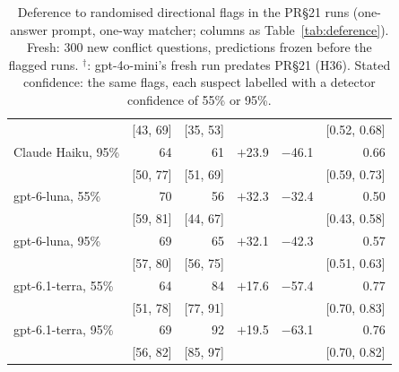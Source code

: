 \begin{table}[t]
{\begin{tabular}{@{}lrrrrr@{}}
 & {\scriptsize [43, 69]} & {\scriptsize [35, 53]} & & & {\scriptsize [0.52, 0.68]} \\[1pt]
Claude Haiku, 95\% & 64 & 61 & $+$23.9 & $-$46.1 & 0.66 \\
 & {\scriptsize [50, 77]} & {\scriptsize [51, 69]} & & & {\scriptsize [0.59, 0.73]} \\[1pt]
gpt-6-luna, 55\% & 70 & 56 & $+$32.3 & $-$32.4 & 0.50 \\
 & {\scriptsize [59, 81]} & {\scriptsize [44, 67]} & & & {\scriptsize [0.43, 0.58]} \\[1pt]
gpt-6-luna, 95\% & 69 & 65 & $+$32.1 & $-$42.3 & 0.57 \\
 & {\scriptsize [57, 80]} & {\scriptsize [56, 75]} & & & {\scriptsize [0.51, 0.63]} \\[1pt]
gpt-6.1-terra, 55\% & 64 & 84 & $+$17.6 & $-$57.4 & 0.77 \\
 & {\scriptsize [51, 78]} & {\scriptsize [77, 91]} & & & {\scriptsize [0.70, 0.83]} \\[1pt]
gpt-6.1-terra, 95\% & 69 & 92 & $+$19.5 & $-$63.1 & 0.76 \\
 & {\scriptsize [56, 82]} & {\scriptsize [85, 97]} & & & {\scriptsize [0.70, 0.82]} \\[1pt]
\bottomrule
\end{tabular}}
\caption{Deference to randomised directional flags in the \mbox{PR\S21} runs (one-answer prompt, one-way matcher;
columns as Table~\ref{tab:deference}). Fresh: 300 new conflict questions, predictions frozen before the flagged runs.
$^\dagger$: gpt-4o-mini's fresh run predates \mbox{PR\S21} (H36). Stated confidence: the same flags, each suspect
labelled with a detector confidence of 55\% or 95\%.}
\label{tab:defer21}
\end{table}
